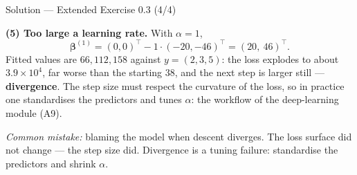 \documentclass[aspectratio=169,11pt]{beamer}
\begin{document}
\begin{frame}{Solution --- Extended Exercise 0.3 (4/4)}
  \begin{solutionbox}
    \textbf{(5) Too large a learning rate.} With $\alpha = 1$,
    \[
      \boldsymbol\beta^{(1)} = (0,0)^\top - 1\cdot(-20,-46)^\top = (20,\ 46)^\top .
    \]
    Fitted values are $66, 112, 158$ against $y = (2,3,5)$: the loss explodes
    to about $3.9\times10^{4}$, far worse than the starting $38$, and the next
    step is larger still --- \textbf{divergence}. The step size must respect
    the curvature of the loss, so in practice one standardises the predictors
    and tunes $\alpha$: the workflow of the deep-learning module (A9).

    \smallskip
    \textit{Common mistake:} blaming the model when descent diverges. The
    loss surface did not change --- the step size did. Divergence is a tuning
    failure: standardise the predictors and shrink $\alpha$.
  \end{solutionbox}
\end{frame}
\end{document}
